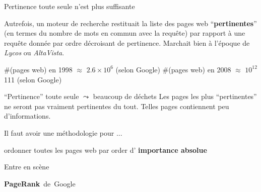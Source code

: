 


\begin{frame}{\Large Pertinence toute seule n'est {\color{red}plus} suffisante}

\pause
\begin{center}
\normalsize Autrefois, un moteur de recherche restituait la liste des pages web
\vskip 0.1cm
\Large ``\textbf{pertinentes}''
\vskip 0.1cm
\scriptsize (en termes du nombre de mots en commun avec la requ\^ete)
\vskip 0.1cm
\normalsize par rapport \`a une requ\^ete donn\'ee par ordre d\'ecroisant de pertinence.
\vskip 0.3cm
\pause
\Large Marchait bien \`a l'\'epoque de \textit{Lycos} ou \textit{AltaVista}.
\end{center}

\large
\pause

\begin{center}
\begin{minipage}{8cm}
\#(pages web) en 1998 $\approx$ $2.6 \times 10^{6}$ (selon Google)
\pause
\vskip 0.1cm
\#(pages web) en 2008 $\approx$ $10^{12}$ {\color{white}111} (selon Google)
\end{minipage}
\end{center}

\Large
\pause

\begin{center}
``Pertinence'' toute seule \; $\leadsto$ \; beaucoup de d\'echets
\vskip 0.2cm
\scriptsize Les pages les plus ``pertinentes'' ne seront pas vraiment pertinentes du tout.
\vskip 0.1cm Telles pages contiennent peu d'informations.
\end{center}

\normalsize
\end{frame}


\begin{frame}{\Large Il faut avoir une m\'ethodologie pour ...}

\pause
\begin{center}
\LARGE ordonner toutes les pages web
\vskip 0.05cm
\LARGE par order d'
\vskip 0.0125cm
\Huge\textbf{importance absolue}
\end{center}

\vskip 0.5cm

\pause
\Large Entre en sc\`ene
\begin{center}
\Huge \textbf{PageRank} \,de\, Google
\end{center}

\normalsize
\end{frame}

